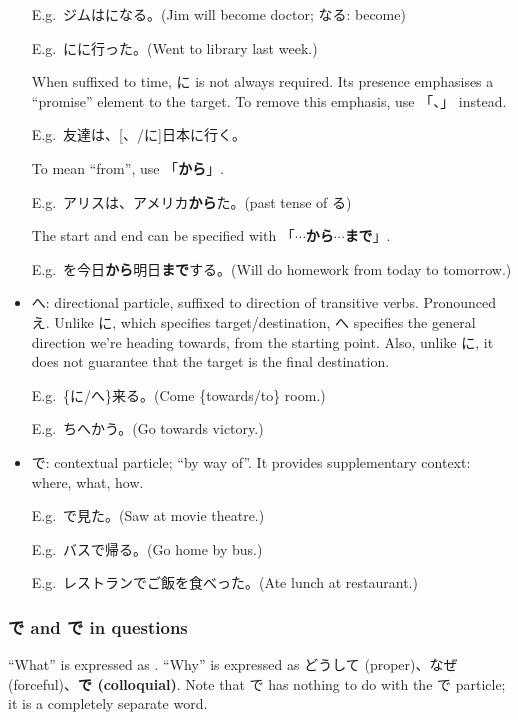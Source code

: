\documentclass[../nihongo-gakushuu-kyouzai.tex]{subfiles}
\begin{document}
\begin{itemize}
    E.g.\ ジムはになる。(Jim will become doctor; なる: become)

    E.g.\ にに行った。(Went to library last week.)

    When suffixed to time, に is not always required. Its presence emphasises a ``promise'' element to the target. To remove this emphasis, use 「、」 instead.

    E.g.\ 友達は、[、/に]日本に行く。

    To mean ``from'', use 「\textbf{から}」.

    E.g.\ アリスは、アメリカ\textbf{から}た。(past tense of る)

    The start and end can be specified with 「\textbf{$\cdots$から$\cdots$まで}」.

    E.g.\ を今日\textbf{から}明日\textbf{まで}する。(Will do homework from today to tomorrow.)

    \item へ: directional particle, suffixed to direction of transitive verbs. Pronounced え. Unlike に, which specifies target/destination, へ specifies the general direction we're heading towards, from the starting point. Also, unlike に, it does not guarantee that the target is the final destination. 

    E.g.\ \{に/へ\}来る。(Come \{towards/to\} room.)

    E.g.\ ちへかう。(Go towards victory.)
    \item で: contextual particle; ``by way of''. It provides supplementary context: where, what, how.

    E.g.\ で見た。(Saw at movie theatre.)

    E.g.\ バスで帰る。(Go home by bus.)

    E.g.\ レストランでご飯を食べった。(Ate lunch at restaurant.)
\end{itemize}

\subsubsection{で and で in questions}
``What'' is expressed as \textbf{}. ``Why'' is expressed as どうして (proper)、なぜ (forceful)、\textbf{で (colloquial)}. Note that で has nothing to do with the で particle; it is a completely separate word.
\end{document}

